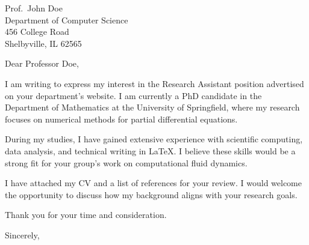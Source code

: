 \documentclass[12pt]{letter}
\date{\today}
\begin{document}
\begin{letter}{%
    Prof.\ John Doe \\
    Department of Computer Science \\
    456 College Road \\
    Shelbyville, IL 62565%
}

\opening{Dear Professor Doe,}

I am writing to express my interest in the Research Assistant position
advertised on your department's website. I am currently a PhD candidate in
the Department of Mathematics at the University of Springfield, where my
research focuses on numerical methods for partial differential equations.

During my studies, I have gained extensive experience with scientific
computing, data analysis, and technical writing in \LaTeX{}. I believe
these skills would be a strong fit for your group's work on computational
fluid dynamics.

I have attached my CV and a list of references for your review. I would
welcome the opportunity to discuss how my background aligns with your
research goals.

Thank you for your time and consideration.

\closing{Sincerely,}


\end{letter}
\end{document}
